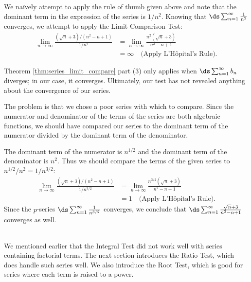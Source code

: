 {We na\"ively attempt to apply the rule of thumb given above and note that the dominant term in the expression of the series is $1/n^2$. Knowing that $\ds \sum_{n=1}^\infty \frac1{n^2}$ converges, we attempt to apply the Limit Comparison Test:
\begin{align*}
\lim_{n\to\infty}\frac{(\sqrt{n}+3)/(n^2-n+1)}{1/n^2} &= \lim_{n\to\infty}\frac{n^2(\sqrt n+3)}{n^2-n+1}\\
		&= \infty \quad \text{(Apply L'H\^opital's Rule)}.
\end{align*}

Theorem \ref{thm:series_limit_compare} part (3) only applies when $\ds\sum_{n=1}^\infty b_n$ diverges; in our case, it converges. Ultimately, our test has not revealed anything about the convergence of our series.

The problem is that we chose a poor series with which to compare. Since the numerator and denominator of the terms of the series are both algebraic functions, we should have compared our series  to the dominant term of the numerator divided by the dominant term of the denominator.

The dominant term of the numerator is $n^{1/2}$ and the dominant term of the denominator is $n^2$. Thus we should compare the terms of the given series to $n^{1/2}/n^2 = 1/n^{3/2}$:
\begin{align*}
\lim_{n\to\infty}\frac{(\sqrt{n}+3)/(n^2-n+1)}{1/n^{3/2}} &= \lim_{n\to \infty} \frac{n^{3/2}(\sqrt n+3)}{n^2-n+1} \\
		&= 1\quad \text{(Apply L'H\^opital's Rule)}.
\end{align*}
Since the  $p$-series $\ds\sum_{n=1}^\infty \frac1{n^{3/2}}$ converges, we conclude that $\ds\sum_{n=1}^\infty \frac{\sqrt{n}+3}{n^2-n+1}$ converges as well.
}\\

\enlargethispage{\baselineskip}
We mentioned earlier that the Integral Test did not work well with series containing factorial terms. The next section introduces the Ratio Test, which does handle such series well. We also introduce the Root Test, which is good for series where each term is raised to a power.


